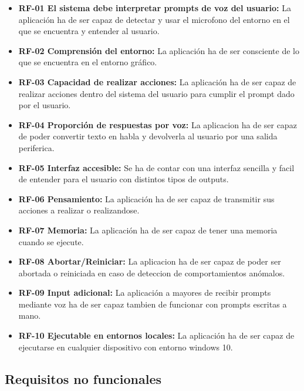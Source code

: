 \begin{itemize}
    \item \textbf{RF-01  El sistema debe interpretar prompts de voz del usuario:} La aplicación ha de ser capaz de detectar y usar el microfono del entorno en el que se encuentra y entender al usuario.
    
    \item \textbf{RF-02 Comprensión del entorno:} La aplicación ha de ser consciente de lo que se encuentra en el entorno gráfico.

    \item \textbf{RF-03 Capacidad de realizar acciones:} La aplicación ha de ser capaz de realizar acciones dentro del sistema del usuario para cumplir el prompt dado por el usuario.

    \item \textbf{RF-04 Proporción de respuestas por voz:} La aplicacion ha de ser capaz de poder convertir texto en habla y devolverla al usuario por una salida periferica.

    \item \textbf{RF-05 Interfaz accesible:} Se ha de contar con una interfaz sencilla y facil de entender para el usuario con distintos tipos de outputs.

    \item \textbf{RF-06 Pensamiento:} La aplicación ha de ser capaz de transmitir sus acciones a realizar o realizandose.

    \item \textbf{RF-07 Memoria:} La aplicación ha de ser capaz de tener una memoria cuando se ejecute.

    \item \textbf{RF-08 Abortar/Reiniciar:} La aplicacion ha de ser capaz de poder ser abortada o reiniciada en caso de deteccion de comportamientos anómalos.

    \item \textbf{RF-09 Input adicional:} La aplicación a mayores de recibir prompts mediante voz ha de ser capaz tambien de funcionar con prompts escritas a mano.

    \item \textbf{RF-10 Ejecutable en entornos locales:} La aplicación ha de ser capaz de ejecutarse en cualquier dispositivo con entorno windows 10.

\end{itemize}

\subsection{Requisitos no funcionales}

